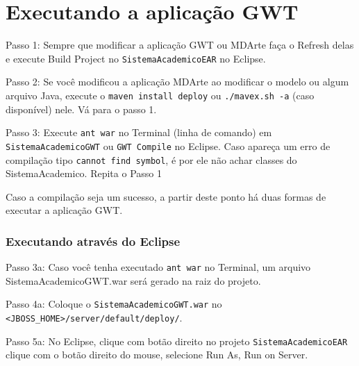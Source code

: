 \section{Executando a aplicação GWT}

Passo 1: Sempre que modificar a aplicação GWT ou MDArte faça o Refresh delas e execute Build Project no
\texttt{SistemaAcademicoEAR} no Eclipse.

Passo 2: Se você modificou a aplicação MDArte ao modificar o modelo ou algum arquivo Java, execute o \texttt{maven install deploy}
ou \texttt{./mavex.sh -a} (caso disponível) nele.
Vá para o passo 1.

Passo 3: Execute \texttt{ant war} no Terminal (linha de comando) em \texttt{SistemaAcademicoGWT} ou \texttt{GWT Compile} no
Eclipse.
Caso apareça um erro de compilação tipo \texttt{cannot find symbol}, é por ele não achar classes do SistemaAcademico.
Repita o Passo 1

Caso a compilação seja um sucesso, a partir deste ponto há duas formas de executar a aplicação GWT.

\subsubsection{Executando através do Eclipse}

Passo 3a: Caso você tenha executado \texttt{ant war} no Terminal, um arquivo SistemaAcademicoGWT.war será gerado na raiz do
projeto.

Passo 4a: Coloque o \texttt{SistemaAcademicoGWT.war} no \texttt{<JBOSS\_HOME>/server/default/deploy/}.

Passo 5a: No Eclipse, clique com botão direito no projeto \texttt{SistemaAcademicoEAR} clique com o botão direito do mouse,
selecione Run As, Run on Server.

